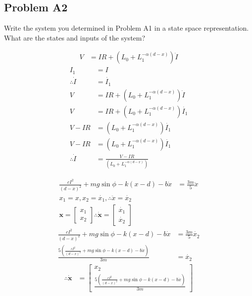 \subsection*{Problem A2}
    Write the system you determined in Problem A1 in a state space representation. What are the states and inputs of the system?

    \begin{align}
        V &= IR + (L_{0} + L_{1} ^{- \alpha (d - x)})\dot{I}
    \end{align}
    \begin{align}
        I_1 &= I\nonumber\\
        \therefore \dot{I} &= \dot{I_1}\nonumber\\
        V &= IR + (L_{0} + L_{1} ^{- \alpha (d - x)})\dot{I}\nonumber\\
        V &= IR + (L_{0} + L_{1} ^{- \alpha (d - x)})\dot{I_1}\nonumber\\
        V - IR &= (L_{0} + L_{1} ^{- \alpha (d - x)})\dot{I_1}\nonumber\\
        V - IR &= (L_{0} + L_{1} ^{- \alpha (d - x)})\dot{I_1}\nonumber\\
        \therefore
        \dot{I} &= \frac{V - IR}{(L_{0} + L_{1} ^{- \alpha (d - x)})}
    \end{align}


    \begin{align}
        \frac{c I^2}{(d - x)^2} + mg \sin{\phi} - k(x -d) - b \dot{x} &= \frac{3m}{5} \ddot{x} \\
        x_1 = x, x_2 = \dot{x_1}, \therefore \ddot{x} = \dot{x_2}\nonumber\\
        \bm{x} =
        \begin{bmatrix}
            x_1
            \\
            x_2
        \end{bmatrix}
        \therefore \bm{\dot{x}} =
        \begin{bmatrix}
            \dot{x_1}
            \\
            \dot{x_2}
        \end{bmatrix} \nonumber
    \end{align}
    \begin{align}
        \frac{c I^2}{(d - x)^2} + mg \sin{\phi} - k(x -d) - b \dot{x} &= \frac{3m}{5} \dot{x_2} \nonumber\\
        \frac{5(\frac{c I^2}{(d - x)^2} + mg \sin{\phi} - k(x -d) - b \dot{x})}{3m} &= \dot{x_2} \nonumber
    \end{align}
    \begin{align}
        \therefore \bm{\dot{x}} &=
        \begin{bmatrix}
            x_2
            \\
            \frac{5(\frac{c I^2}{(d - x)^2} + mg \sin{\phi} - k(x -d) - b \dot{x})}{3m}
        \end{bmatrix}
    \end{align}




